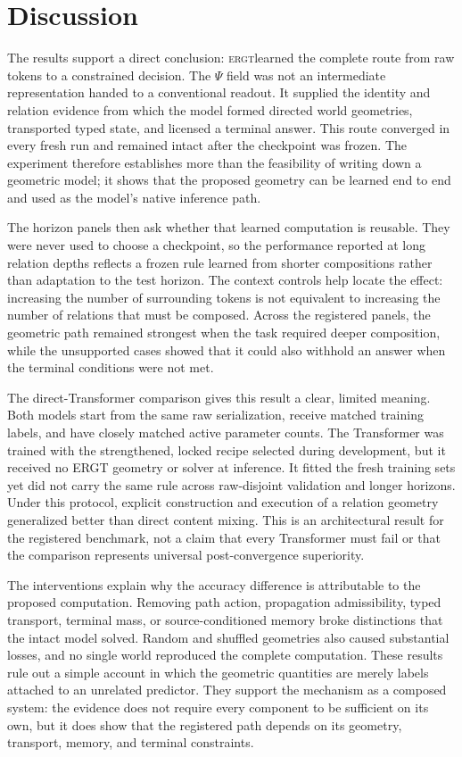 \documentclass[11pt]{article}
\newcommand{\ERGT}{\textsc{ergt}}
\begin{document}
\section{Discussion}
\label{sec:discussion}

The results support a direct conclusion: \ERGT learned the complete route from
raw tokens to a constrained decision. The $\Psi$ field was not an intermediate
representation handed to a conventional readout. It supplied the identity and
relation evidence from which the model formed directed world geometries,
transported typed state, and licensed a terminal answer. This route converged
in every fresh run and remained intact after the checkpoint was frozen. The
experiment therefore establishes more than the feasibility of writing down a
geometric model; it shows that the proposed geometry can be learned end to end
and used as the model's native inference path.

The horizon panels then ask whether that learned computation is reusable. They
were never used to choose a checkpoint, so the performance reported at long
relation depths reflects a frozen rule learned from shorter compositions rather
than adaptation to the test horizon. The context controls help locate the
effect: increasing the number of surrounding tokens is not equivalent to
increasing the number of relations that must be composed. Across the registered
panels, the geometric path remained strongest when the task required deeper
composition, while the unsupported cases showed that it could also withhold an
answer when the terminal conditions were not met.

The direct-Transformer comparison gives this result a clear, limited meaning.
Both models start from the same raw serialization, receive matched training
labels, and have closely matched active parameter counts. The Transformer was
trained with the strengthened, locked recipe selected during development, but
it received no ERGT geometry or solver at inference. It fitted the fresh
training sets yet did not carry the same rule across raw-disjoint validation and
longer horizons. Under this protocol, explicit construction and execution of a
relation geometry generalized better than direct content mixing. This is an
architectural result for the registered benchmark, not a claim that every
Transformer must fail or that the comparison represents universal
post-convergence superiority.

The interventions explain why the accuracy difference is attributable to the
proposed computation. Removing path action, propagation admissibility, typed
transport, terminal mass, or source-conditioned memory broke distinctions that
the intact model solved. Random and shuffled geometries also caused substantial
losses, and no single world reproduced the complete computation. These results
rule out a simple account in which the geometric quantities are merely labels
attached to an unrelated predictor. They support the mechanism as a composed
system: the evidence does not require every component to be sufficient on its
own, but it does show that the registered path depends on its geometry,
transport, memory, and terminal constraints.
\end{document}
